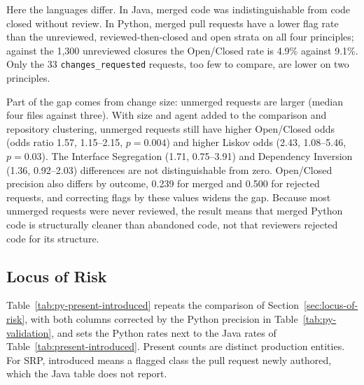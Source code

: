 Here the languages differ. In Java, merged code was indistinguishable from code closed without
review. In Python, merged pull requests have a lower flag rate than the unreviewed, reviewed-then-closed
and open strata on all four principles; against the 1{,}300 unreviewed closures the Open/Closed rate
is 4.9\% against 9.1\%. Only the 33 \texttt{changes\_requested} requests, too few to compare, are
lower on two principles.

Part of the gap comes from change size: unmerged requests are larger (median four files against
three). With size and agent added to the comparison and repository clustering, unmerged requests
still have higher Open/Closed odds (odds ratio 1.57, 1.15--2.15, $p = 0.004$) and higher Liskov odds
(2.43, 1.08--5.46, $p = 0.03$). The Interface Segregation (1.71, 0.75--3.91) and Dependency Inversion
(1.36, 0.92--2.03) differences are not distinguishable from zero. Open/Closed precision also differs
by outcome, 0.239 for merged and 0.500 for rejected requests, and correcting flags by these values
widens the gap. Because most unmerged requests were never reviewed, the result means that merged
Python code is structurally cleaner than abandoned code, not that reviewers rejected code for its
structure.

\subsection{Locus of Risk}
\label{sec:python-locus}

Table~\ref{tab:py-present-introduced} repeats the comparison of Section~\ref{sec:locus-of-risk},
with both columns corrected by the Python precision in Table~\ref{tab:py-validation}, and sets the
Python rates next to the Java rates of Table~\ref{tab:present-introduced}. Present counts are distinct
production entities. For SRP, introduced means a flagged class the pull request newly authored, which
the Java table does not report.

